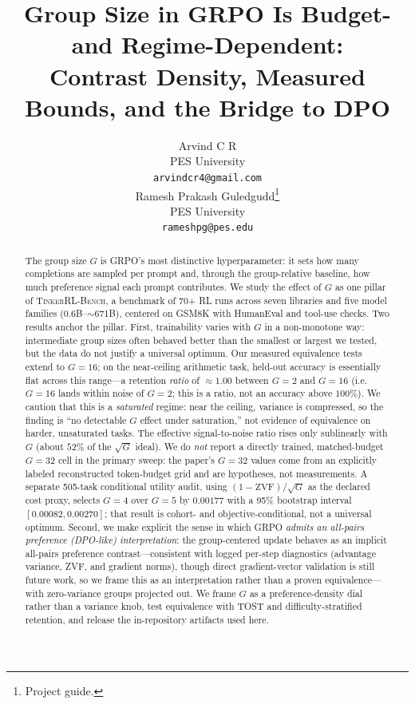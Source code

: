 \documentclass{article}
\title{Group Size in GRPO Is Budget- and Regime-Dependent:\\
       Contrast Density, Measured Bounds, and the Bridge to DPO}
\author{
  Arvind C R \\
  PES University\\
  \texttt{arvindcr4@gmail.com} \\
  \And
  Ramesh Prakash Guledgudd\thanks{Project guide.} \\
  PES University\\
  \texttt{rameshpg@pes.edu} \\
}
\newcommand{\ours}{\textsc{TinkerRL-Bench}}
\begin{document}
\sloppy {}  \hfuzz=2pt
\maketitle
\begin{abstract}
The group size $G$ is GRPO's most distinctive hyperparameter: it sets how many
completions are sampled per prompt and, through the group-relative baseline, how
much preference signal each prompt contributes. We study the effect of $G$ as one
pillar of \ours{}, a benchmark of 70+ RL runs across seven libraries and
five model families ($0.6$B--$\sim$671B), centered on GSM8K with HumanEval and
tool-use checks. Two results
anchor the pillar. First, trainability varies with $G$ in a non-monotone way:
intermediate group sizes often behaved better than the smallest or largest we
tested, but the data do not justify a universal optimum. Our measured equivalence
tests extend to $G{=}16$; on the near-ceiling arithmetic task, held-out accuracy
is essentially flat across this range---a retention \emph{ratio} of ${\approx}1.00$
between $G{=}2$ and $G{=}16$ (i.e.\ $G{=}16$ lands within noise of $G{=}2$; this is
a ratio, not an accuracy above $100\%$). We caution that this is a \emph{saturated}
regime: near the ceiling, variance is compressed, so the finding is ``no detectable
$G$ effect under saturation,'' not evidence of equivalence on harder, unsaturated
tasks. The effective signal-to-noise ratio
rises only sublinearly with $G$ (about $52\%$ of the $\sqrt{G}$ ideal). We do
\emph{not} report a directly trained, matched-budget $G{=}32$ cell in the
primary sweep: the paper's $G{=}32$ values come from an explicitly labeled
reconstructed token-budget grid and are hypotheses, not measurements. A separate
505-task conditional utility audit, using $(1-\mathrm{ZVF})/\sqrt{G}$ as the
declared cost proxy, selects $G{=}4$ over $G{=}5$ by $0.00177$ with a 95\%
bootstrap interval $[0.00082,0.00270]$; that result is cohort- and
objective-conditional, not a universal optimum. Second, we make explicit the sense in which GRPO
\emph{admits an all-pairs preference (DPO-like) interpretation}: the group-centered
update behaves as an implicit all-pairs preference
contrast---consistent with logged per-step diagnostics (advantage variance,
ZVF, and gradient norms), though direct gradient-vector validation is still future
work, so we frame this as an interpretation rather than a proven equivalence---with zero-variance groups
projected out. We frame $G$ as a preference-density dial rather than a variance
knob, test equivalence with TOST and difficulty-stratified retention, and release
the in-repository artifacts used here.
\end{abstract}
\end{document}
